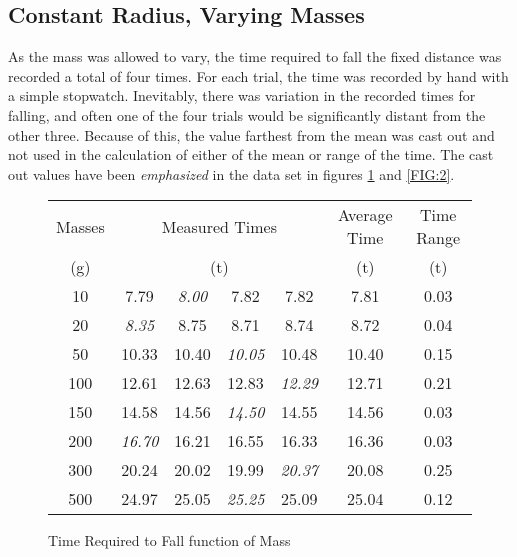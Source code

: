\documentclass[11pt]{article}
\begin{document}
\subsection{Constant Radius, Varying Masses}
As the mass was allowed to vary, the time required to fall the fixed distance was recorded a total of four times. For each trial, the time was recorded by hand with a simple stopwatch. Inevitably, there was variation in the recorded times for falling, and often one of the four trials would be significantly distant from the other three. Because of this, the value farthest from the mean was cast out and not used in the calculation of either of the mean or range of the time. The cast out values have been \emph{emphasized} in the data set in figures \ref{FIG:1} and \ref{FIG:2}.
\begin{figure}[h]
		\caption{Time Required to Fall function of Mass }
	\begin{center}
	\begin{tabular}{| c | c c c c | c | c |}
	\hline
	Masses & \multicolumn{4}{c|}{Measured Times} & Average Time & Time Range \\
	 (g) & \multicolumn{4}{c|}{(t)} & (t) & (t) \\
	\hline
	10 & 7.79 & \emph{8.00} & 7.82 & 7.82 & 7.81 & 0.03 \\ 
	20 & \emph{8.35} & 8.75 & 8.71 & 8.74 & 8.72 & 0.04 \\
	50 & 10.33 & 10.40 & \emph{10.05} & 10.48 & 10.40 & 0.15 \\ 
	100 & 12.61 & 12.63 & 12.83 & \emph{12.29} & 12.71 & 0.21 \\ 
	150 & 14.58 & 14.56 & \emph{14.50} & 14.55 & 14.56 & 0.03 \\ 
	200 & \emph{16.70} & 16.21 & 16.55 & 16.33 & 16.36 & 0.03 \\
	300 & 20.24 & 20.02 & 19.99 & \emph{20.37} & 20.08 & 0.25 \\  
	500 & 24.97 & 25.05 & \emph{25.25} & 25.09 & 25.04 & 0.12 \\
	\hline 
	\end{tabular}
	\end{center}
	\label{FIG:1}
\end{figure}
\end{document}
